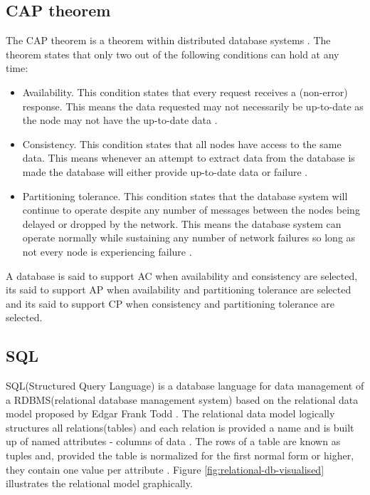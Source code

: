 \subsection{CAP theorem}
The CAP theorem is a theorem within distributed database systems \cite{sql-schema}.
The theorem states that only two out of the following conditions can hold at any time:
\begin{itemize}
    \item Availability.
    This condition states that every request receives a (non-error) response.
    This means the data requested may not necessarily be up-to-date as the node may not have the up-to-date data \cite{sql-schema}.
    \item Consistency.
    This condition states that all nodes have access to the same data.
    This means whenever an attempt to extract data from the database is made the database will either provide up-to-date data or failure \cite{sql-schema}.
    \item Partitioning tolerance.
    This condition states that the database system will continue to operate despite any number of messages between the nodes being delayed or dropped by the network.
    This means the database system can operate normally while sustaining any number of network failures so long as not every node is experiencing failure \cite{sql-schema}.
\end{itemize}

A database is said to support AC when availability and consistency are selected, its said to support AP when availability and partitioning tolerance are selected and its said to support CP when consistency and partitioning tolerance are selected.
\fi

\subsection{SQL} 
SQL(Structured Query Language) is a database language for data management\cite{sql-goal} of a RDBMS(relational database management system) \cite{sql-is-a-rdbms} based on the relational data model proposed by Edgar Frank Todd \cite{rdbms}.
The relational data model logically structures all relations(tables) and each relation is provided a name and is built up of named attributes - columns of data \cite{sql-is-a-rdbms}.
The rows of a table are known as tuples \cite{sql-is-a-rdbms} and, provided the table is normalized for the first normal form or higher, they contain one value per attribute \cite{sql-1nf}.
Figure \ref{fig:relational-db-visualised} illustrates the relational model graphically.

